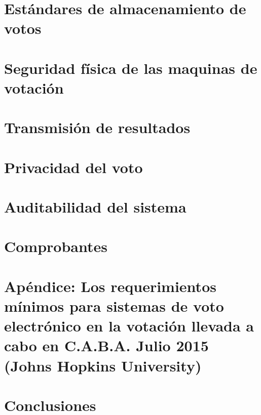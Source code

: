 \documentclass[11pt]{article}
\begin{document}
\pagebreak
\section{Estándares de almacenamiento de votos}


\pagebreak
\section{Seguridad física de las maquinas de votación}


\pagebreak
\section{Transmisión de resultados}


\pagebreak
\section{Privacidad del voto}



\pagebreak
\section{Auditabilidad del sistema}


\pagebreak
\section{Comprobantes}


\pagebreak
\section{Apéndice: Los requerimientos mínimos para sistemas de voto electrónico en la votación llevada a cabo en C.A.B.A. Julio 2015 (Johns Hopkins University)}


\pagebreak
\section{Conclusiones}

\pagebreak
\printbibliography
\end{document}
